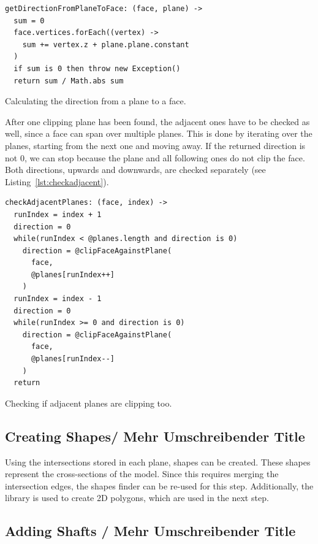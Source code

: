 \documentclass[../ClassicThesis.tex]{subfiles}
\begin{document}
\begin{listing}
\begin{verbatim}
getDirectionFromPlaneToFace: (face, plane) ->
  sum = 0
  face.vertices.forEach((vertex) ->
    sum += vertex.z + plane.plane.constant
  )
  if sum is 0 then throw new Exception()
  return sum / Math.abs sum
\end{verbatim}
\caption{Calculating the direction from a plane to a face.}
\label{lst:facedirection}
\end{listing}

After one clipping plane has been found, the adjacent ones have to be checked as well, since a face can span over multiple planes. This is done by iterating over the planes, starting from the next one and moving away. If the returned direction is not 0, we can stop because the plane and all following ones do not clip the face. Both directions, upwards and downwards, are checked separately (see Listing~\ref{lst:checkadjacent}).

\begin{listing}
\begin{verbatim}
checkAdjacentPlanes: (face, index) ->
  runIndex = index + 1
  direction = 0
  while(runIndex < @planes.length and direction is 0)
    direction = @clipFaceAgainstPlane(
      face, 
      @planes[runIndex++]
    )
  runIndex = index - 1
  direction = 0
  while(runIndex >= 0 and direction is 0)
    direction = @clipFaceAgainstPlane(
      face, 
      @planes[runIndex--]
    )
  return
\end{verbatim}
\caption{Checking if adjacent planes are clipping too.}
\label{lst:checkadjacent}
\end{listing}

\subsection{Creating Shapes/ Mehr Umschreibender Title}

Using the intersections stored in each plane, shapes can be created. These shapes represent the cross-sections of the model. Since this requires merging the intersection edges, the shapes finder can be re-used for this step. Additionally, the \jsclipper{} library is used to create 2D polygons, which are used in the next step.

\subsection{Adding Shafts / Mehr Umschreibender Title}
\end{document}
